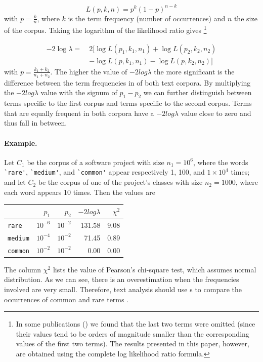 \documentclass[10pt]{book}
\begin{document}
$$ L(p,k,n) = p^k ( 1 - p) ^ { n - k }$$
\noindent
with $p = \frac{k}{n}$, where $k$ is the term frequency (\ie number of occurrences) and $n$ the size of the corpus. Taking the logarithm of the likelihood ratio gives
\footnote{In some publications (\eg \cite{Rayson}) we found that the last two terms were omitted (since their values tend to be orders of magnitude smaller than the corresponding values of the first two terms). The results presented in this paper, however, are obtained using the complete log likelihood ratio formula.}

\begin{align*}
-2 \log \lambda =~&2 \big[ \log L(p_1,k_1,n_1) + \log L(p_2,k_2,n_2)\\
 &- \log L(p,k_1,n_1) - \log L(p,k_2,n_2) \big] 
\end{align*}
\noindent
with $p = \frac{k_1 + k_2}{n_1 + n_2}$. The higher the value of $-2log\lambda$ the more significant is the difference between the term frequencies in of both text corpora. By multiplying the $-2log\lambda$ value with the signum of $p_1 - p_2$ we can further distinguish between terms specific to the first corpus and terms specific to the second corpus. Terms that are equally frequent in both corpora have a $-2log\lambda$ value close to zero and thus fall in between.

\paragraph{Example.} Let $C_1$ be the corpus of a software project with size $n_1 = 10^6$, where the words \verb$`rare'$, \verb$`medium'$, and \verb$`common'$ appear respectively 1, 100, and $1\times10^4$ times; and let $C_2$ be the corpus of one of the project's classes with size $n_2 = 1000$, where each word appears 10 times. Then the \loglr{} values are

\begin{center}
\begin{tabular}{l | rrrr}
~ & $p_1$ & $p_2$ & $-2log\lambda$ & $\chi^2$ \\ 
\hline
\verb$rare$ & $10^{-6}$ & $10^{-2}$  & 131.58 & 9.08 \\
\verb$medium$ & $10^{-4}$ & $10^{-2}$  & 71.45 & 0.89 \\
\verb$common$ & $10^{-2}$ & $10^{-2}$  & 0.00 & 0.00 \\
\end{tabular}
\end{center}

The column $\chi^2$ lists the value of Pearson's chi-square test, which assumes normal distribution. As we can see, there is an overestimation when the frequencies involved are very small. Therefore, text analysis should use \loglr{}s to compare the occurrences of common and rare terms \cite{Dunning}.
\end{document}
